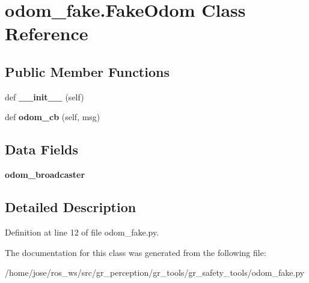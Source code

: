 \hypertarget{classodom__fake_1_1FakeOdom}{}\section{odom\+\_\+fake.\+Fake\+Odom Class Reference}
\label{classodom__fake_1_1FakeOdom}
\subsection*{Public Member Functions}
\begin{DoxyCompactItemize}
\item 
\mbox{\label{classodom__fake_1_1FakeOdom_a07eb7dd8d88066ac18dab8a038ea287d}} 
def {\bfseries \+\_\+\+\_\+init\+\_\+\+\_\+} (self)
\item 
\mbox{\label{classodom__fake_1_1FakeOdom_a63cf6c62b63cfb8c980884030adc696b}} 
def {\bfseries odom\+\_\+cb} (self, msg)
\end{DoxyCompactItemize}
\subsection*{Data Fields}
\begin{DoxyCompactItemize}
\item 
\mbox{\label{classodom__fake_1_1FakeOdom_a41c5cedc6173c824678e728129bfdb62}} 
{\bfseries odom\+\_\+broadcaster}
\end{DoxyCompactItemize}


\subsection{Detailed Description}


Definition at line 12 of file odom\+\_\+fake.\+py.



The documentation for this class was generated from the following file\+:\begin{DoxyCompactItemize}
\item 
/home/jose/ros\+\_\+ws/src/gr\+\_\+perception/gr\+\_\+tools/gr\+\_\+safety\+\_\+tools/odom\+\_\+fake.\+py\end{DoxyCompactItemize}
